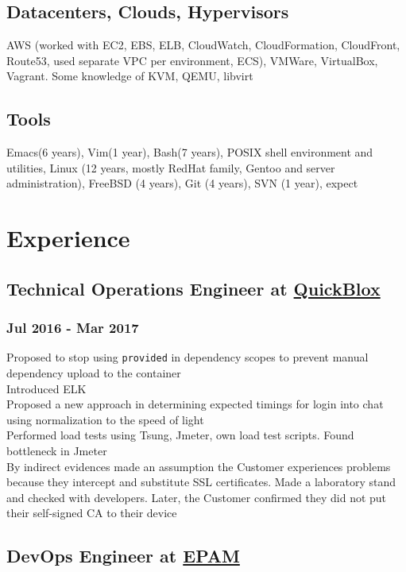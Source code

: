 \documentclass[letterpaper]{article}
\begin{document}
\subsection{Datacenters, Clouds, Hypervisors}
\label{sec-1-7}
AWS (worked with EC2, EBS, ELB, CloudWatch, CloudFormation, CloudFront, Route53, used separate VPC per environment, ECS), VMWare, VirtualBox, Vagrant. Some knowledge of KVM, QEMU, libvirt
\subsection{Tools}
\label{sec-1-8}
Emacs(6 years), Vim(1 year), Bash(7 years), POSIX shell environment and utilities, Linux (12 years, mostly RedHat family, Gentoo and server administration), FreeBSD (4 years), Git (4 years), SVN (1 year), expect

\section{Experience}
\label{sec-2}
\subsection{Technical Operations Engineer at \href{https://quickblox.com}{QuickBlox}}
\label{sec-2-1}
\subsubsection{Jul 2016 - Mar 2017}
\label{sec-2-1-1}
Proposed to stop using \verb~provided~ in dependency scopes to prevent manual dependency upload to the container\\
Introduced ELK\\
Proposed a new approach in determining expected timings for login into chat using normalization to the speed of light\\
Performed load tests using Tsung, Jmeter, own load test scripts. Found bottleneck in Jmeter\\
By indirect evidences made an assumption the Customer experiences problems because they intercept and substitute SSL certificates. Made a laboratory stand and checked with developers. Later, the Customer confirmed they did not put their self-signed CA to their device\\
\subsection{DevOps Engineer at \href{https://epam.com}{EPAM}}
\label{sec-2-2}
\end{document}
